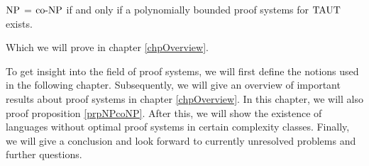   \begin{proposition} \label{prpNPcoNP}
    \(\text{NP}\) = \(\text{co-NP}\) if and only if a polynomially bounded proof systems for \(\text{TAUT}\) exists.
  \end{proposition}

  Which we will prove in chapter \ref{chpOverview}.
  
  To get insight into the field of proof systems, we will first define the notions used in the following chapter. Subsequently, we will give an overview of important results about proof systems in chapter \ref{chpOverview}. In this chapter, we will also proof proposition \ref{prpNPcoNP}. After this, we will show the existence of languages without optimal proof systems in certain complexity classes. Finally, we will give a conclusion and look forward to currently unresolved problems and further questions. 

